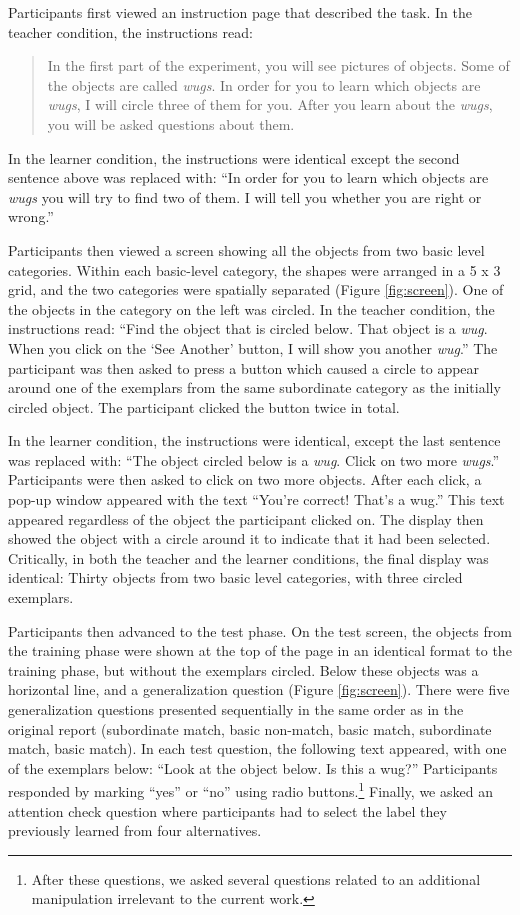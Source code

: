 \documentclass[man]{apa2}
\begin{document}
Participants first viewed an instruction page that described the task. In the teacher condition, the instructions read: 
\begin{quote}
In the first part of the experiment, you will see pictures of objects. Some of the objects are called \textit{wugs}. In order for you to learn which objects are \textit{wugs}, I will circle three of them for you. After you learn about the \textit{wugs}, you will be asked questions about them.
\end{quote}
In the learner condition, the instructions were identical except the second sentence above was replaced with: ``In order for you to learn which objects are \textit{wugs} you will try to find two of them. I will tell you whether you are right or wrong.''

Participants then viewed a screen showing all the objects from two basic level categories. Within each basic-level category, the shapes were arranged in a 5 x 3 grid, and the two categories were spatially separated (Figure \ref{fig:screen}). One of the objects in the category on the left was circled. In the teacher condition, the instructions read: ``Find the object that is circled below. That object is a \textit{wug}. When you click on the `See Another' button, I will show you another \textit{wug}.'' The participant was then asked to press a button which caused a circle to appear around one of the exemplars from the same subordinate category as the initially circled object. The participant clicked the button twice in total. 

In the learner condition, the instructions were identical, except the last sentence was replaced with: ``The object circled below is a \textit{wug}. Click on two more \textit{wugs}.'' Participants were then asked to click on two more objects. After each click, a pop-up window appeared with the text ``You're correct! That's a wug.'' This text appeared regardless of the object the participant clicked on. The display then showed the object with a circle around it to indicate that it had been selected. Critically, in both the teacher and the learner conditions, the final display was identical: Thirty objects from two basic level categories, with three circled exemplars.

Participants then advanced to the test phase. On the test screen, the objects from the training phase were shown at the top of the page in an identical format to the training phase, but without the exemplars circled. Below these objects was a horizontal line, and a generalization question (Figure \ref{fig:screen}). There were five generalization questions presented sequentially in the same order as in the original report (subordinate match, basic non-match, basic match, subordinate match, basic match). In each test question, the following text appeared, with one of the exemplars below: ``Look at the object below. Is this a wug?'' Participants responded by marking ``yes'' or ``no'' using radio buttons.\footnote{After these questions, we asked several questions related to an additional manipulation irrelevant to the current work.} Finally, we asked an attention check question where participants had to select the label they previously learned from four alternatives.
\end{document}
